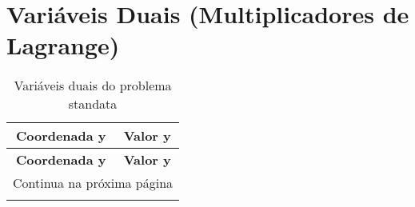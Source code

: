 \documentclass[12pt]{article}
\begin{document}
\section{Variáveis Duais (Multiplicadores de Lagrange)}

\begin{longtable}{@{}cc@{}}
\caption{Variáveis duais do problema standata} \\
\toprule
\textbf{Coordenada y} & \textbf{Valor y} \\
\midrule
\endfirsthead

\toprule
\textbf{Coordenada y} & \textbf{Valor y} \\
\midrule
\endhead

\midrule \multicolumn{2}{r}{{Continua na próxima página}} \\ \midrule
\endfoot


\end{longtable}
\end{document}
